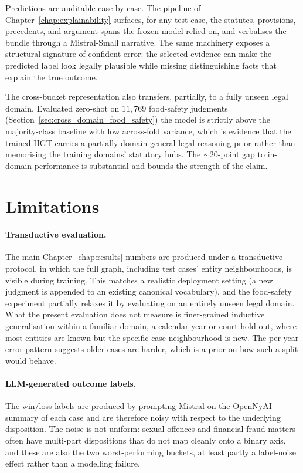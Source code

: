 Predictions are auditable case by case. The 
pipeline of Chapter~\ref{chap:explainability} surfaces, for any test
case, the statutes, provisions, precedents, and argument spans the
frozen model relied on, and verbalises the bundle through a
Mistral-Small narrative. The same machinery exposes a structural
signature of confident error: the selected evidence can make the
predicted label look legally plausible while missing distinguishing
facts that explain the true outcome.

The cross-bucket representation also transfers, partially, to a fully
unseen legal domain. Evaluated zero-shot on
$11{,}769$ food-safety judgments
(Section~\ref{sec:cross_domain_food_safety}) the model is strictly
above the majority-class baseline with low across-fold variance,
which is evidence that the trained HGT carries a partially
domain-general legal-reasoning prior rather than memorising the
training domains' statutory hubs. The $\sim\!20$-point gap to
in-domain performance is substantial and bounds the strength of the
claim.

\section{Limitations}

\paragraph{Transductive evaluation.} The main Chapter~\ref{chap:results}
numbers are produced under a transductive protocol, in which the full
graph, including test cases' entity neighbourhoods, is visible
during training. This matches a realistic deployment setting (a new
judgment is appended to an existing canonical vocabulary), and the
food-safety experiment partially relaxes it by evaluating on an
entirely unseen legal domain. What the present evaluation does not
measure is finer-grained inductive generalisation within a familiar
domain, a calendar-year or court hold-out, where most entities are
known but the specific case neighbourhood is new. The per-year error
pattern suggests older cases are harder, which is a prior on how such
a split would behave.

\paragraph{LLM-generated outcome labels.} The win/loss labels are
produced by prompting Mistral on the OpenNyAI summary of each case
and are therefore noisy with respect to the underlying disposition.
The noise is not uniform: sexual-offences and financial-fraud matters
often have multi-part dispositions that do not map cleanly onto a
binary axis, and these are also the two worst-performing buckets,
at least partly a label-noise effect rather than a modelling
failure.

